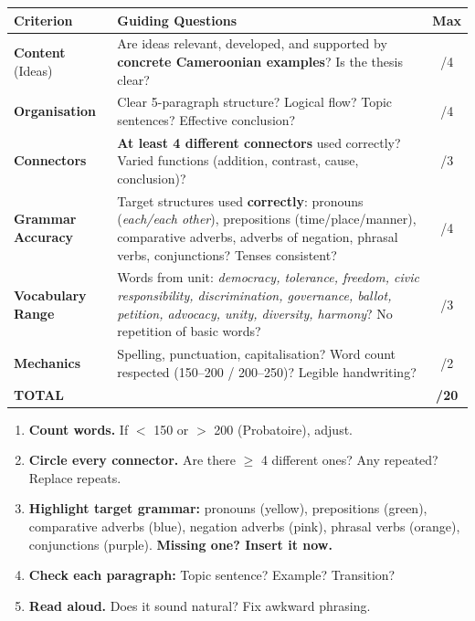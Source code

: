 \documentclass[11pt]{article}
\begin{document}
\begin{center}
\begin{tabularx}{\linewidth}{|l|X|c|}\hline
\rowcolor{popblueL} \textbf{Criterion} & \textbf{Guiding Questions} & \textbf{Max} \\ \hline
\textbf{Content} (Ideas) & Are ideas relevant, developed, and supported by \textbf{concrete Cameroonian examples}? Is the thesis clear? & /4 \\ \hline
\textbf{Organisation} & Clear 5-paragraph structure? Logical flow? Topic sentences? Effective conclusion? & /4 \\ \hline
\textbf{Connectors} & \textbf{At least 4 different connectors} used correctly? Varied functions (addition, contrast, cause, conclusion)? & /3 \\ \hline
\textbf{Grammar Accuracy} & Target structures used \textbf{correctly}: pronouns (\emph{each/each other}), prepositions (time/place/manner), comparative adverbs, adverbs of negation, phrasal verbs, conjunctions? Tenses consistent? & /4 \\ \hline
\textbf{Vocabulary Range} & Words from unit: \emph{democracy, tolerance, freedom, civic responsibility, discrimination, governance, ballot, petition, advocacy, unity, diversity, harmony}? No repetition of basic words? & /3 \\ \hline
\textbf{Mechanics} & Spelling, punctuation, capitalisation? Word count respected (150--200 / 200--250)? Legible handwriting? & /2 \\ \hline
\textbf{TOTAL} &  & \textbf{/20} \\ \hline
\end{tabularx}
\end{center}

\begin{methode}
\begin{enumerate}
\item \textbf{Count words.} If $<$ 150 or $>$ 200 (Probatoire), adjust.
\item \textbf{Circle every connector.} Are there $\ge$ 4 different ones? Any repeated? Replace repeats.
\item \textbf{Highlight target grammar:} pronouns (yellow), prepositions (green), comparative adverbs (blue), negation adverbs (pink), phrasal verbs (orange), conjunctions (purple). \textbf{Missing one? Insert it now.}
\item \textbf{Check each paragraph:} Topic sentence? Example? Transition?
\item \textbf{Read aloud.} Does it sound natural? Fix awkward phrasing.
\end{enumerate}
\end{methode}
\end{document}

